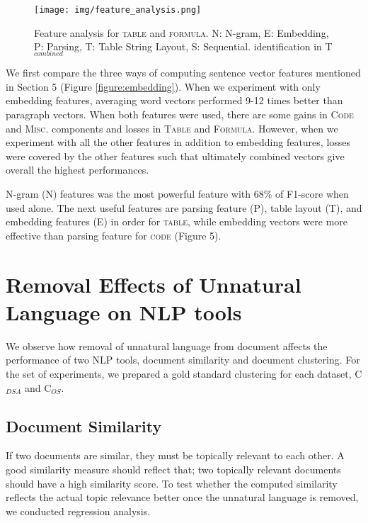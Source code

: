 \documentclass[11pt,letterpaper]{article}
\begin{document}
\begin{figure}[h]
\centering
\texttt{[image: img/feature\_analysis.png]}
\vspace{-3mm}
\caption{Feature analysis for \textsc{table} and \textsc{formula}. N: N-gram, E: Embedding, P: Parsing, T: Table String Layout, S: Sequential.  identification in T$_{combined}$}
\label{figure:figure_analysis}
\end{figure}

We first compare the three ways of computing sentence vector features mentioned in Section 5 (Figure \ref{figure:embedding}). When we experiment with only embedding features, averaging word vectors performed 9-12 times better than paragraph vectors. When both features were used, there are some gains in \textsc{Code} and \textsc{Misc.} components and losses in \textsc{Table} and \textsc{Formula}. However, when we experiment with all the other features in addition to embedding features, losses were covered by the other features such that ultimately combined vectors give overall the highest performances. 

N-gram (N) features was the most powerful feature with 68\% of F1-score when used alone. The next useful features are parsing feature (P), table layout (T), and embedding features (E) in order for \textsc{table}, while embedding vectors were more effective than parsing feature for \textsc{code} (Figure 5). 

\section{Removal Effects of Unnatural Language on NLP tools} 
We observe how removal of unnatural language from document affects the performance of two NLP tools, document similarity and document clustering. For the set of experiments, we prepared a gold standard clustering for each dataset, C$_{DSA}$ and C$_{OS}$. 

 
 
 

\subsection{Document Similarity}
If two documents are similar, they must be topically relevant to each other. A good similarity measure should reflect that; two topically relevant documents should have a high similarity score. To test whether the computed similarity reflects the actual topic relevance better once the unnatural language is removed, we conducted regression analysis.
\end{document}
